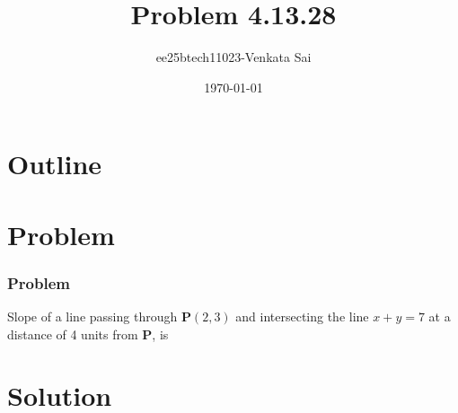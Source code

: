 \documentclass{beamer}
\title{Problem 4.13.28}
\author{ee25btech11023-Venkata Sai}
\date{\today}
\providecommand{\brak}[1]{\ensuremath{\left(#1\right)}}
\theoremstyle{remark}
\let\vec\mathbf
\numberwithin{equation}{section}
\begin{document}
\begin{frame}
\titlepage
\end{frame}

\section*{Outline}
\begin{frame}
\tableofcontents
\end{frame}

\section{Problem}

\begin{frame}
\frametitle{Problem}
\setcounter{section}{1}
Slope of a line passing through $\vec{P}\brak{2,3}$ and intersecting the line $x+y=7$ at a distance of 4 units from $\vec{P}$, is
\end{frame}
\section{Solution}
\end{document}
